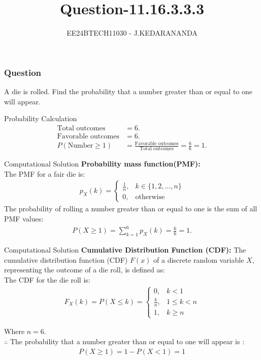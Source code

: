\documentclass{beamer}
\title{Question-11.16.3.3.3}
\author{EE24BTECH11030 - J.KEDARANANDA}
\date{}
\begin{document}
	
	\frame{\titlepage}
	
	\begin{frame}
		\frametitle{Question}
		A die is rolled. Find the probability that a number greater than or equal to one will appear.
	\end{frame}
	\begin{frame}{Probability Calculation}
		\begin{align}
			\text{Total outcomes} &= 6. \\
			\text{Favorable outcomes} &= 6. \\
			P(\text{Number} \geq 1) &= \frac{\text{Favorable outcomes}}{\text{Total outcomes}} = \frac{6}{6} = 1.
		\end{align}
	\end{frame}
	\begin{frame}{Computational Solution}
		\textbf{Probability mass function(PMF):}\\
		The PMF for a fair die is:
		\begin{align}
			p_{X}(k) =
			\begin{cases}
				\frac{1}{n}, & k \in \{1, 2,\dots ,n\} \\
				0, & \text{otherwise}
			\end{cases}
		\end{align}	
		The probability of rolling a number greater than or equal to one is the sum of all PMF values:
		\begin{align}
			P(X \geq 1) = \sum_{k=1}^{6} p_X(k) = \frac{6}{6} = 1.
		\end{align}
	\end{frame}
	\begin{frame}{Computational Solution}
		\textbf{Cumulative Distribution Function (CDF):}
		The cumulative distribution function (CDF) \(F(x)\) of a discrete random variable \(X\), representing the outcome of a die roll, is defined as: \\
		
		The CDF for the die roll is:
		\begin{align}
			F_X(k) = P(X \leq k) =
			\begin{cases}
				0, & k < 1 \\
				\frac{k}{n}, & 1 \leq k < n\\
				1, & k \geq n
			\end{cases} \label{cdf}
		\end{align}
		
		Where \( n = 6 \). \\ 
		$\therefore$ The probability that a number greater than or equal to one will appear is : 
		\begin{align}
			P(X \geq 1) = 1 - P(X < 1) = 1
		\end{align}
	\end{frame}
	
\end{document}
